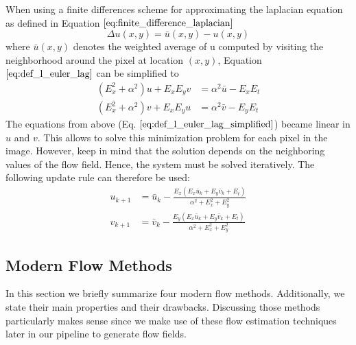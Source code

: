 When using a finite differences scheme for approximating the laplacian equation
as defined in Equation $\ref{eq:finite_difference_laplacian}$
\begin{equation}
	\Delta u(x,y) = \bar{u} (x,y) - u(x,y)
\label{eq:finite_difference_laplacian}
\end{equation}
where $\bar{u} (x,y)$ denotes the weighted average of u computed by visiting the neighborhood around the pixel at location $(x,y)$, Equation $\ref{eq:def_l_euler_lag}$ can be simplified to
\begin{equation}
\begin{aligned}
(E_x^2 + \alpha^2) u + E_x E_y v &= \alpha^2 \bar{u} - E_x E_t \\
(E_x^2 + \alpha^2) v + E_x E_y u &= \alpha^2 \bar{v} - E_y E_t
\end{aligned}
\label{eq:def_l_euler_lag_simplified}
\end{equation}
The equations from above (Eq. $\ref{eq:def_l_euler_lag_simplified}$) became linear in $u$ and $v$. This allows to solve this minimization problem for each pixel in the image. However, keep in mind that the solution depends on the neighboring values of the flow field. Hence, the system must be solved iteratively. The following update rule can therefore be used:
\begin{equation}
\begin{aligned}
 u_{k+1} &= \bar{u}_k - \frac{E_x (E_x \bar{u}_k + E_y \bar{v}_k + E_t)}{\alpha^2 + E_x^2 + E_y^2} \\
  v_{k+1} &= \bar{v}_k - \frac{E_y (E_x \bar{u}_k + E_y \bar{v}_k + E_t)}{\alpha^2 + E_x^2 + E_y^2}
\end{aligned}
\label{eq:hs_iteration}
\end{equation}

\subsection{Modern Flow Methods}
\label{sec:impl_optical_flow}
In this section we briefly summarize four modern flow methods. Additionally, we state their main properties and their drawbacks. Discussing those methods particularly makes sense since we make use of these flow estimation techniques later in our pipeline to generate flow fields.

